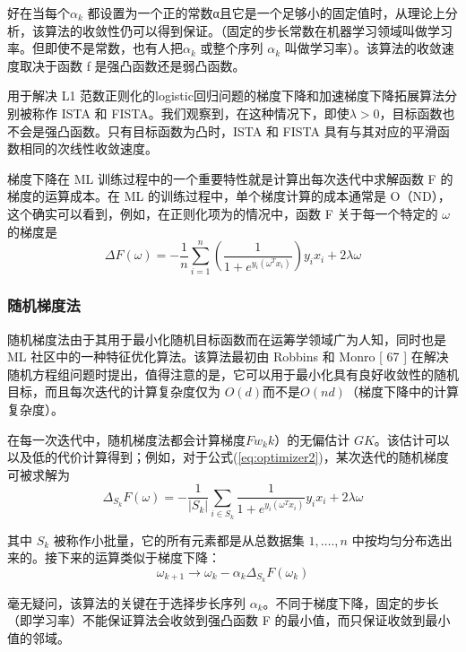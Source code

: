 \documentclass{book}
\begin{document}
好在当每个$\alpha_k$ 都设置为一个正的常数α且它是一个足够小的固定值时，从理论上分析，该算法的收敛性仍可以得到保证。（固定的步长常数在机器学习领域叫做学习率。但即使不是常数，也有人把$\alpha_k$ 或整个序列 {$\alpha_k$ } 叫做学习率）。该算法的收敛速度取决于函数 f 是强凸函数还是弱凸函数。

用于解决 L1 范数正则化的logistic回归问题的梯度下降和加速梯度下降拓展算法分别被称作 ISTA 和 FISTA。我们观察到，在这种情况下，即使$\lambda> 0$，目标函数也不会是强凸函数。只有目标函数为凸时，ISTA 和 FISTA 具有与其对应的平滑函数相同的次线性收敛速度。

梯度下降在 ML 训练过程中的一个重要特性就是计算出每次迭代中求解函数 F 的梯度的运算成本。在 ML 的训练过程中，单个梯度计算的成本通常是 O（ND），这个确实可以看到，例如，在正则化项为的情况中，函数 F 关于每一个特定的 $\omega$ 的梯度是
\begin{equation}\label{eq:optimizer3}
	\Delta F(\omega) = -\frac{1}{n}\sum_{i=1}^n(\frac{1}{1+e^{y_i(\omega^Tx_i)}})y_i x_i+2\lambda\omega 
\end{equation}

\subsubsection{随机梯度法}

随机梯度法由于其用于最小化随机目标函数而在运筹学领域广为人知，同时也是 ML 社区中的一种特征优化算法。该算法最初由 Robbins 和 Monro [ 67 ] 在解决随机方程组问题时提出，值得注意的是，它可以用于最小化具有良好收敛性的随机目标，而且每次迭代的计算复杂度仅为 $O(d)$而不是$ O(nd)$（梯度下降中的计算复杂度）。

在每一次迭代中，随机梯度法都会计算梯度$ Fw_kk）$的无偏估计 $GK$。该估计可以以及低的代价计算得到；例如，对于公式(\ref{eq:optimizer2})，某次迭代的随机梯度可被求解为
\begin{equation}\label{eq:optimizer6}
	\Delta_{S_k}F(\omega)=-\frac{1}{|S_k|}\sum_{i\in S_k}\frac{1}{1+e^{y_i(\omega^Tx_i)}}y_ix_i+2\lambda\omega
\end{equation}


其中 $S_k$ 被称作小批量，它的所有元素都是从总数据集 {$1,\ldots.,n$} 中按均匀分布选出来的。接下来的运算类似于梯度下降：
\begin{equation}\label{eq:optimizer7}
	\omega_{k+1}\rightarrow \omega_k-\alpha_k\Delta_{S_k}F(\omega_k)
\end{equation}



毫无疑问，该算法的关键在于选择步长序列 {$\alpha_k$}。不同于梯度下降，固定的步长（即学习率）不能保证算法会收敛到强凸函数 F 的最小值，而只保证收敛到最小值的邻域。
\end{document}

